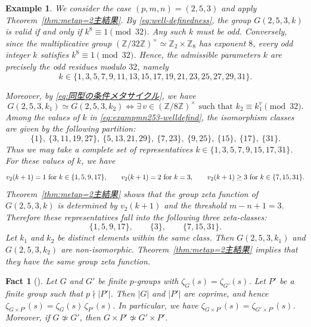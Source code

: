 \documentclass[onecolumn]{article}
\numberwithin{equation}{section}
\theoremstyle{mytheoremstyle}
\newtheorem{fac}[thm]{Fact}
\newtheorem{exam}[thm]{Example}
\begin{document}
\begin{exam}\label{exam:pmn253case}
We consider the case $(p,m,n)=(2,5,3)$ and apply
Theorem~\ref{thm:metap=2主結果}.
By \eqref{eq:well-definedness}, the group $G(2,5,3,k)$ is valid if and only if
$k^{8}\equiv 1 \pmod{32}$.
Any such $k$ must be odd.
Conversely, since the multiplicative group
$(\mathbb{Z}/32\mathbb{Z})^{\times}\simeq \mathbb{Z}_{2}\times \mathbb{Z}_{8}$
has exponent $8$, every odd integer $k$ satisfies $k^{8}\equiv 1 \pmod{32}$.
Hence, the admissible parameters $k$ are precisely the odd residues modulo $32$, namely
\begin{equation}\label{eq:exampmn253-welldefind}
  k \in \{1,3,5,7,9,11,13,15,17,19,21,23,25,27,29,31\}.
\end{equation}

Moreover, by \eqref{eq:同型の条件メタサイクル}, we have
\[
  G(2,5,3,k_{1})\simeq G(2,5,3,k_{2})
  \iff
  \exists\, v\in(\mathbb{Z}/8\mathbb{Z})^{\times}
  \text{ such that } k_{2}\equiv k_{1}^{v}\pmod{32}.
\]
Among the values of $k$ in \eqref{eq:exampmn253-welldefind}, the isomorphism
classes are given by the following partition:
\begin{equation}\label{eq:exampmn253-iso}
  \{1\},\ \{3,11,19,27\},\ \{5,13,21,29\},\ \{7,23\},\ \{9,25\},\ \{15\},\ \{17\},\ \{31\}.
\end{equation}
Thus we may take a complete set of representatives $k\in\{1,3,5,7,9,15,17,31\}$.
For these values of $k$, we have
\[
v_{2}(k+1)=1 \textup{ for } k\in\{1,5,9,17\},\qquad
v_{2}(k+1)=2 \textup{ for } k=3,\qquad
v_{2}(k+1)\ge 3 \textup{ for } k\in\{7,15,31\}.
\]
Theorem~\ref{thm:metap=2主結果} shows that the group zeta function
of $G(2,5,3,k)$ is determined by $v_{2}(k+1)$ and the threshold $m-n+1=3$.
Therefore these representatives fall into the following three zeta-classes:
\begin{equation}\label{eq:非同型だがゼータ一致クラス}
 \{1,5,9,17\},\qquad \{3\},\qquad \{7,15,31\}. 
\end{equation}
Let $k_{1}$ and $k_{2}$ be distinct elements within the same class.
Then $G(2,5,3,k_{1})$ and $G(2,5,3,k_{2})$ are non-isomorphic.
Theorem~\ref{thm:metap=2主結果} implies that they have the same group zeta function.


\end{exam}



\begin{fac}[\cite{Hironaka2017}]\label{fac:coprime-product-multiplicativity}
Let $G$ and $G'$ be finite $p$-groups with $\zeta_{G}(s)=\zeta_{G'}(s)$.
Let $P'$ be a finite group such that $p\nmid |P'|$.
Then $|G|$ and $|P'|$ are coprime, and hence $\zeta_{G\times P'}(s)=\zeta_{G}(s)\,\zeta_{P'}(s)$.
In particular, we have $\zeta_{G\times P'}(s)=\zeta_{G'\times P'}(s)$. 
Moreover, if $G\not\simeq G'$, then $G\times P'\not\simeq G'\times P'$.
\end{fac}
\end{document}
